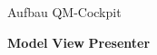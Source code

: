 \begin{frame}{Aufbau QM-Cockpit}
\begin{overlayarea}{\textwidth}{.67\textheight}
 \end{overlayarea}
 \begin{block}{\textbf<2>{Model} \textbf<3>{View} \textbf<4>{Presenter}}\end{block}
\end{frame}
